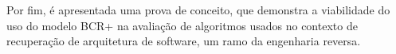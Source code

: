 Por fim, é apresentada uma prova de conceito, que demonstra a viabilidade do uso do modelo BCR+ na avaliação de algoritmos usados no contexto de recuperação de arquitetura de software, um ramo da engenharia reversa.




